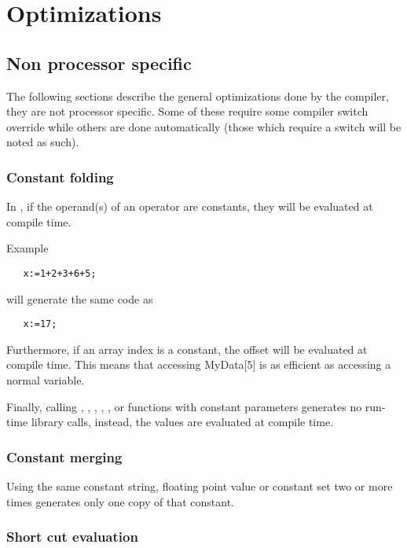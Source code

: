 {%
\chapter{Optimizations}

\section{Non processor specific}

The following sections describe the general optimizations
done by the compiler, they are not processor specific. Some
of these require some compiler switch override while others are done
automatically (those which require a switch will be noted as such).

\subsection{Constant folding}

In \fpc, if the operand(s) of an operator are constants, they
will be evaluated at compile time.

Example

\begin{verbatim}
   x:=1+2+3+6+5;
\end{verbatim}
will generate the same code as
\begin{verbatim}
   x:=17;
\end{verbatim}

Furthermore, if an array index is a constant, the offset will
be evaluated at compile time. This means that accessing MyData[5]
is as efficient as accessing a normal variable.

Finally, calling , , , , ,
or  functions with constant parameters generates no
run-time library calls, instead, the values are evaluated at
compile time.

\subsection{Constant merging}

Using the same constant string, floating point value or constant set 
two or more times generates only one copy of that constant.

\subsection{Short cut evaluation}

}
